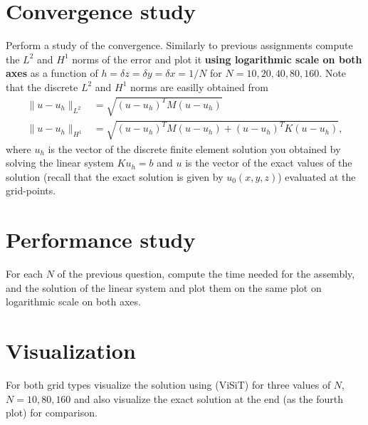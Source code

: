 \documentclass[unicode,11pt,a4paper,oneside,numbers=endperiod,openany]{scrartcl}
\begin{document}
\section{Convergence study}
Perform a study of the convergence. Similarly to
previous assignments compute the $L^2$ and $H^1$ norms of the error and plot it {\bf using logarithmic scale on both axes}
as a function of $h = \delta z = \delta y = \delta x = 1/N$ for $N=10,20,40,80,160$.
Note that the discrete $L^2$ and $H^1$ norms are easilly obtained from
\begin{align*}
\|u - u_h\|_{L^2} &= \sqrt{(u-u_h)^T M (u-u_h)} \\
\|u - u_h\|_{H^1} &= \sqrt{(u-u_h)^T M (u-u_h) + (u-u_h)^T K (u-u_h)},
\end{align*}
where $u_h$ is the vector of the discrete finite element solution you 
obtained by solving the linear system $K u_h = b$ and $u$ is the vector
of the exact values of the solution (recall that the exact solution
is given by $u_0(x,y,z)$) evaluated at the grid-points. 

\section{Performance study}
For each $N$ of the previous question, compute the time needed for the assembly,
and the solution of the linear system and plot them on the same plot on logarithmic 
scale on both axes.

\section{Visualization}
For both grid types visualize the solution using (ViSiT) for three values of $N$, $N=10,80,160$ 
and also visualize the exact solution at the end (as the fourth plot) for comparison.
\end{document}
